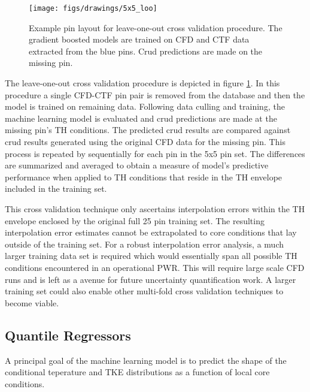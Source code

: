 \begin{figure}[h]
    \centering
    \texttt{[image: figs/drawings/5x5\_loo]}
    \caption[Example pin layout for leave-one-out cross validation procedure.]{Example pin layout for leave-one-out cross validation procedure.  The gradient boosted models are trained on CFD and CTF data extracted from the blue pins.  Crud predictions are made on the missing pin.}
    \label{fig:5x5loo}
\end{figure}

The leave-one-out cross validation procedure is depicted in figure \ref{fig:5x5loo}.  In this procedure a single CFD-CTF pin pair is removed from the database and then the model is trained on remaining data.  Following data culling and training, the machine learning model is evaluated and crud predictions are made
at the missing pin's TH conditions.  The predicted crud results are compared against crud results generated using the original CFD data for the missing pin.  This process is repeated by sequentially for each pin in the 5x5 pin set.  The differences are summarized and averaged to obtain a measure of model's predictive performance when applied to TH conditions that reside in the TH envelope included in the training set.

This cross validation technique only ascertains interpolation errors within the TH envelope enclosed by the original full 25 pin training set.  The resulting interpolation error estimates cannot be extrapolated to core conditions that lay outside of the training set.  For a robust interpolation error analysis, a much larger training data set is required which would essentially span all possible TH conditions encountered in an operational PWR.  This will require large scale CFD runs and is left as a avenue for future uncertainty quantification work.  A larger training set could also enable other multi-fold cross validation techniques to become viable.

\subsection{Quantile Regressors}

A principal goal of the machine learning model is to predict the shape of the conditional teperature and TKE distributions as a function of local core conditions.

